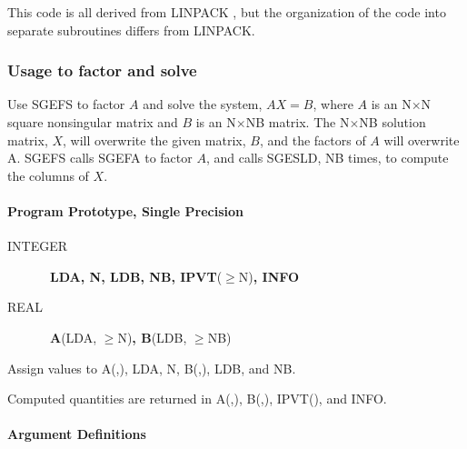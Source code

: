 \documentclass[twoside]{MATH77}
\begin{document}
This code is all derived from LINPACK \cite{Dongarra:1979:LUG}, but the
organization of the code into separate subroutines differs from LINPACK.

\subsubsection{Usage to factor and solve}

Use SGEFS to factor $A$ and solve the system, $AX = B$, where $A$ is an
N$\times $N square nonsingular matrix and $B$ is an N$\times $NB matrix.
The N$\times $NB
solution matrix, $X$, will overwrite the given matrix, $B$, and the factors
of $A$ will overwrite A. SGEFS calls SGEFA to factor $A$, and calls SGESLD, NB
times, to compute the columns of $X$.

\paragraph{Program Prototype, Single Precision}

\begin{description}

\item[INTEGER] \ {\bf LDA, N, LDB, NB, IPVT}($\geq $N){\bf , INFO}

\item[REAL] \ {\bf A}(LDA, $\geq $N){\bf , B}(LDB, $\geq $NB)

\end{description}

Assign values to A(,), LDA, N, B(,), LDB, and NB.

\begin{center}
\end{center}

Computed quantities are returned in A(,), B(,), IPVT(), and INFO.

\paragraph{Argument Definitions}
\end{document}
